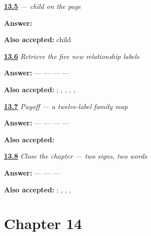 \noindent\begin{minipage}[t]{\linewidth}
\raggedright
\hyperlink{review-MW-C09-bachcha-dictation}{\textbf{13.5}} \emph{ — child on the page}\par
\small \textbf{Answer:} \par
\footnotesize \textbf{Also accepted:}  child
\end{minipage}\par\medskip

\noindent\begin{minipage}[t]{\linewidth}
\raggedright
\hyperlink{review-MW-R09-family-new-five-recall}{\textbf{13.6}} \emph{Retrieve the five new relationship labels}\par
\small \textbf{Answer:}  —  —  —  — \par
\footnotesize \textbf{Also accepted:}     ; , , , , 
\end{minipage}\par\medskip

\noindent\begin{minipage}[t]{\linewidth}
\raggedright
\hyperlink{review-MW-C09-family-twelve-payoff}{\textbf{13.7}} \emph{Payoff — a twelve-label family map}\par
\small \textbf{Answer:}  —  —  —  — \par
\footnotesize \textbf{Also accepted:}     
\end{minipage}\par\medskip

\noindent\begin{minipage}[t]{\linewidth}
\raggedright
\hyperlink{review-MW-R09-script-close-recall}{\textbf{13.8}} \emph{Close the chapter — two signs, two words}\par
\small \textbf{Answer:}  —  —  — \par
\footnotesize \textbf{Also accepted:}    ; , , , 
\end{minipage}\par\medskip

\section*{Chapter 14}

